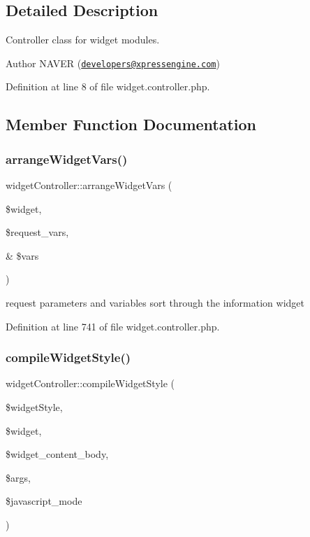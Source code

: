 \subsection{Detailed Description}
Controller class for widget modules. 

\begin{DoxyAuthor}{Author}
N\+A\+V\+ER (\href{mailto:developers@xpressengine.com}{\tt developers@xpressengine.\+com}) 
\end{DoxyAuthor}


Definition at line 8 of file widget.\+controller.\+php.



\subsection{Member Function Documentation}
\mbox{\label{classwidgetController_a7f852fc1f0b521ff574f85ee067173ce}} 
\subsubsection{\texorpdfstring{arrange\+Widget\+Vars()}{arrangeWidgetVars()}}
{\footnotesize\ttfamily widget\+Controller\+::arrange\+Widget\+Vars (\begin{DoxyParamCaption}\item[{}]{\$widget,  }\item[{}]{\$request\+\_\+vars,  }\item[{\&}]{\$vars }\end{DoxyParamCaption})}



request parameters and variables sort through the information widget 



Definition at line 741 of file widget.\+controller.\+php.

\mbox{\label{classwidgetController_ad399f4e9088de6b63e479bfd68c1f2a0}} 
\subsubsection{\texorpdfstring{compile\+Widget\+Style()}{compileWidgetStyle()}}
{\footnotesize\ttfamily widget\+Controller\+::compile\+Widget\+Style (\begin{DoxyParamCaption}\item[{}]{\$widget\+Style,  }\item[{}]{\$widget,  }\item[{}]{\$widget\+\_\+content\+\_\+body,  }\item[{}]{\$args,  }\item[{}]{\$javascript\+\_\+mode }\end{DoxyParamCaption})}



